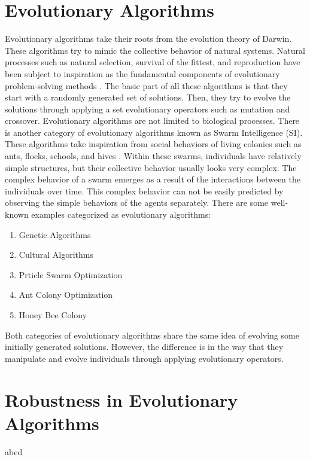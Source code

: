 \section{Evolutionary Algorithms}
Evolutionary algorithms take their roots from the evolution theory of Darwin. These algorithms try to mimic the collective behavior of natural systems. Natural processes such as natural selection, survival of the fittest, and reproduction have been subject to inspiration as the fundamental components of evolutionary problem-solving methods \cite{burke2005search}. The basic part of all these algorithms is that they start with a randomly generated set of solutions. Then, they try to evolve the solutions through applying a set evolutionary operators such as mutation and crossover. \newline
Evolutionary algorithms are not limited to biological processes. There is another category of evolutionary algorithms known as Swarm Intelligence (SI). These algorithms take inspiration from social behaviors of living colonies such as ants, flocks, schools, and hives \cite{kennedy2001swarm}. Within these swarms, individuals have relatively simple structures, but their collective behavior usually looks very complex. The complex behavior of a swarm emerges as a result of the interactions between the individuals over time. This complex behavior can not be easily predicted by observing the simple behaviors of the agents separately. \newline
There are some well-known examples categorized as evolutionary algorithms:
\begin{enumerate}
	\item Genetic Algorithms
	\item Cultural Algorithms
	\item Prticle Swarm Optimization
	\item Ant Colony Optimization
	\item Honey Bee Colony
\end{enumerate}
Both categories of evolutionary algorithms share the same idea of evolving some initially generated solutions. However, the difference is in the way that they manipulate and evolve individuals through applying evolutionary operators. 
\section{Robustness in Evolutionary Algorithms}
abcd
